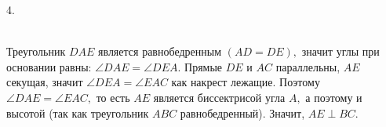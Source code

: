 4. \begin{figure}[ht!]
\end{figure}\\
Треугольник $DAE$ является равнобедренным $(AD=DE),$ значит углы при основании равны: $\angle DAE=\angle DEA.$ Прямые $DE$ и $AC$ параллельны, $AE$ секущая, значит  $\angle DEA=\angle EAC$ как накрест лежащие. Поэтому $\angle DAE=\angle EAC,$ то есть $AE$ является биссектрисой угла $A,$ а поэтому и высотой (так как треугольник $ABC$ равнобедренный). Значит, $AE\perp BC.$\\

